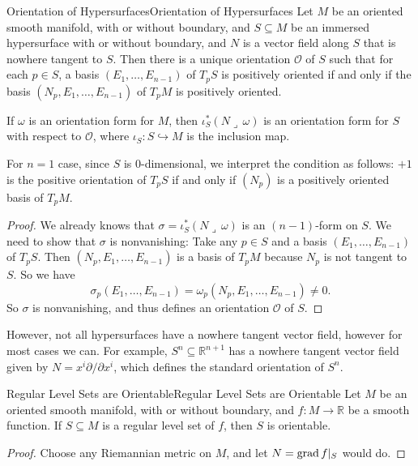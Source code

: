 \documentclass[../main.tex]{subfiles}
\begin{document}
\begin{theorem}{Orientation of Hypersurfaces}{Orientation of Hypersurfaces}
  Let $M$ be an oriented smooth manifold, with or without boundary, and $S \subseteq M$ be an immersed hypersurface with or without boundary, and $N$ is a vector field along $S$ that is nowhere tangent to $S$. Then there is a unique orientation $\mathcal{O}$ of $S$ such that for each $p \in S$, a basis $(E_1, \ldots , E_{n-1})$ of $T_pS$ is positively oriented if and only if the basis $(N_p, E_1, \ldots , E_{n-1})$ of $T_pM$ is positively oriented.

  If $\omega$ is an orientation form for $M$, then $\iota_S^* (N \lrcorner \, \omega)$ is an orientation form for $S$ with respect to $\mathcal{O}$, where $\iota_S : S \hookrightarrow M$ is the inclusion map.
\end{theorem}
For $n=1$ case, since $S$ is 0-dimensional, we interpret the condition as follows: $+1$ is the positive orientation of $T_pS$ if and only if $(N_p)$ is a positively oriented basis of $T_pM$.

\begin{proof}
  We already knows that $\sigma = \iota_S^* (N \lrcorner \, \omega)$ is an $(n-1)$-form on $S$. We need to show that $\sigma$ is nonvanishing: Take any $p \in S$ and a basis $(E_1, \ldots , E_{n-1})$ of $T_pS$. Then $(N_p, E_1, \ldots , E_{n-1})$ is a basis of $T_pM$ because $N_p$ is not tangent to $S$. So we have
  \begin{equation*}
    \sigma_p(E_1, \ldots , E_{n-1}) = \omega_p(N_p, E_1, \ldots , E_{n-1}) \neq 0.
  \end{equation*}
  So $\sigma$ is nonvanishing, and thus defines an orientation $\mathcal{O}$ of $S$.
\end{proof}

However, not all hypersurfaces have a nowhere tangent vector field, however for most cases we can. For example, $S^n \subseteq \mathbb{R}^{n+1}$ has a nowhere tangent vector field given by $N = x^i \partial/\partial x^i$, which defines the standard orientation of $S^n$.

\begin{proposition}{Regular Level Sets are Orientable}{Regular Level Sets are Orientable}
  Let $M$ be an oriented smooth manifold, with or without boundary, and $f : M \to \mathbb{R}$ be a smooth function. If $S \subseteq M$ is a regular level set of $f$, then $S$ is orientable.
\end{proposition}
\begin{proof}
  Choose any Riemannian metric on $M$, and let $N = \operatorname{grad} f|_S$ would do.
\end{proof}
\end{document}
